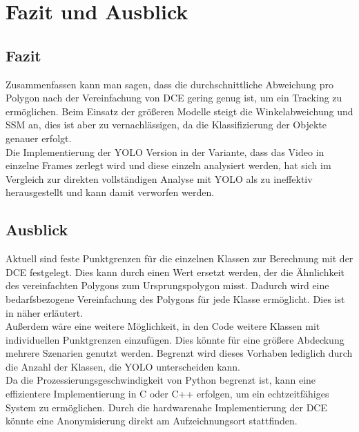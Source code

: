 \chapter{Fazit und Ausblick}
\label{ch:conclusion}
\section{Fazit}
{
    Zusammenfassen kann man sagen, dass die durchschnittliche Abweichung pro Polygon nach der Vereinfachung von DCE gering genug ist, um ein Tracking zu ermöglichen. Beim Einsatz der größeren Modelle steigt die Winkelabweichung und SSM an, dies ist aber zu vernachlässigen, da die Klassifizierung der Objekte genauer erfolgt.  \\
	Die Implementierung der YOLO Version in der Variante, dass das Video in einzelne Frames zerlegt wird und diese einzeln analysiert werden, hat sich im Vergleich zur direkten vollständigen Analyse mit YOLO als zu ineffektiv herausgestellt und kann damit verworfen werden.
    }
\section{Ausblick}
{
	Aktuell sind feste Punktgrenzen für die einzelnen Klassen zur Berechnung mit der DCE festgelegt. Dies kann durch einen Wert ersetzt werden, der die Ähnlichkeit des vereinfachten Polygons zum Ursprungspolygon misst. Dadurch wird eine bedarfsbezogene Vereinfachung des Polygons für jede Klasse ermöglicht. Dies ist in \citeauthor{Latecki2003} \citep{Latecki2003} näher erläutert. \\
	Außerdem wäre eine weitere Möglichkeit, in den Code weitere Klassen mit individuellen Punktgrenzen einzufügen. Dies könnte für eine größere Abdeckung mehrere Szenarien genutzt werden. Begrenzt wird dieses Vorhaben lediglich durch die Anzahl der Klassen, die YOLO unterscheiden kann. \\
	Da die Prozessierungsgeschwindigkeit von Python begrenzt ist, kann eine effizientere Implementierung in C oder C++ erfolgen, um ein echtzeitfähiges System zu ermöglichen.
	Durch die hardwarenahe Implementierung der DCE könnte eine Anonymisierung direkt am Aufzeichnungsort stattfinden.

}

